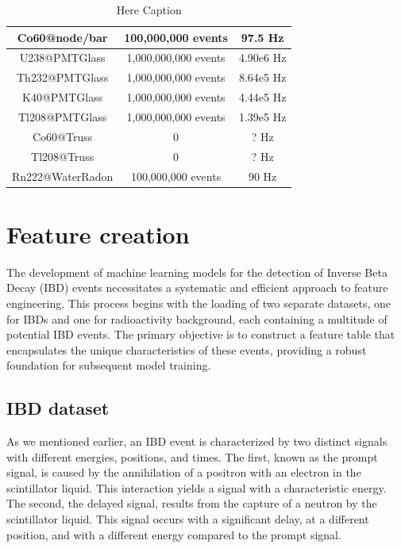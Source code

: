 \begin{table}[htp]
\begin{tabular}{|c|c|c|}
   Co60@node/bar   &  100,000,000 events   &           97.5 Hz             \\\hline
   U238@PMTGlass   & 1,000,000,000 events  &          4.90e6 Hz            \\\hline
  Th232@PMTGlass   & 1,000,000,000 events  &          8.64e5 Hz            \\\hline
   K40@PMTGlass    & 1,000,000,000 events  &          4.44e5 Hz            \\\hline
  Tl208@PMTGlass   & 1,000,000,000 events  &          1.39e5 Hz            \\\hline
    Co60@Truss     &           0           &             ? Hz              \\\hline
    Tl208@Truss    &           0           &             ? Hz              \\\hline
 Rn222@WaterRadon  &  100,000,000 events   &            90 Hz              \\\hline
\end{tabular}
\caption{Here Caption}
\label{tab:BKG_gen}
\end{table}

\newpage

\section{Feature creation}
The development of machine learning models for the detection of Inverse Beta Decay (IBD) events necessitates a systematic and efficient approach to feature engineering. This process begins with the loading of two separate datasets, one for IBDs and one for radioactivity background, each containing a multitude of potential IBD events. The primary objective is to construct a feature table that encapsulates the unique characteristics of these events, providing a robust foundation for subsequent model training.

\subsection{IBD dataset}
As we mentioned earlier, an IBD event is characterized by two distinct signals with different energies, positions, and times. The first, known as the prompt signal, is caused by the annihilation of a positron with an electron in the scintillator liquid. This interaction yields a signal with a characteristic energy. The second, the delayed signal, results from the capture of a neutron by the scintillator liquid. This signal occurs with a significant delay, at a different position, and with a different energy compared to the prompt signal.

